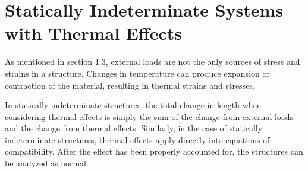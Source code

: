 \documentclass[
10pt,
a4paper,
openany,
svgnames,
]{book} %
\begin{document}
\section{Statically Indeterminate Systems with Thermal Effects}

As mentioned in section 1.3, external loads are not the only sources of stress and strains in a structure. Changes in temperature can produce expansion or contraction of the material, resulting in thermal strains and stresses.

In statically indeterminate structures, the total change in length when considering thermal effects is simply the sum of the change from external loads and the change from thermal effects. Similarly, in the case of statically indeterminate structures, thermal effects apply directly into equations of compatibility. After the effect has been properly accounted for, the structures can be analyzed as normal.
\end{document}
